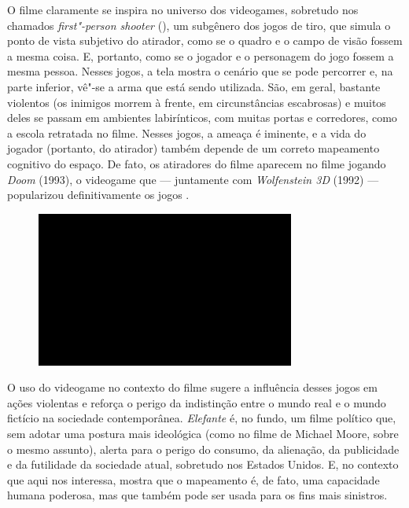 O filme claramente se inspira no universo dos videogames,
sobretudo nos chamados \emph{first"-person shooter} (), um subgênero
dos jogos de tiro, que simula o ponto de vista subjetivo do atirador,
como se o quadro e o campo de visão fossem a mesma coisa. E, portanto,
como se o jogador e o personagem do jogo fossem a mesma pessoa. Nesses
jogos, a tela mostra o cenário que se pode percorrer e, na parte
inferior, vê"-se a arma que está sendo utilizada. São, em geral, bastante
violentos (os inimigos morrem à frente, em circunstâncias escabrosas) e
muitos deles se passam em ambientes labirínticos, com muitas portas e
corredores, como a escola retratada no filme. Nesses jogos, a ameaça é
iminente, e a vida do jogador (portanto, do atirador) também depende de
um correto mapeamento cognitivo do espaço. De fato, os atiradores do
filme aparecem no filme jogando \emph{Doom} (1993), o videogame que ---
juntamente com \emph{Wolfenstein 3D} (1992) --- popularizou
definitivamente os jogos .

\begin{figure}[!ht]

\centering
 \includegraphics[width=85mm]{./imgs/im1.jpg}
\caption{\tiny{}}

\end{figure}


O uso do videogame no contexto do filme sugere a influência
desses jogos em ações violentas e reforça o perigo da indistinção entre
o mundo real e o mundo fictício na sociedade contemporânea.
\emph{Elefante} é, no fundo, um filme político que, sem adotar uma
postura mais ideológica (como no filme de Michael Moore, sobre o mesmo
assunto), alerta para o perigo do consumo, da alienação, da publicidade e
da futilidade da sociedade atual, sobretudo
nos Estados Unidos. E, no contexto que aqui nos interessa, mostra que o
mapeamento é, de fato, uma capacidade humana poderosa, mas que também
pode ser usada para os fins mais sinistros.

